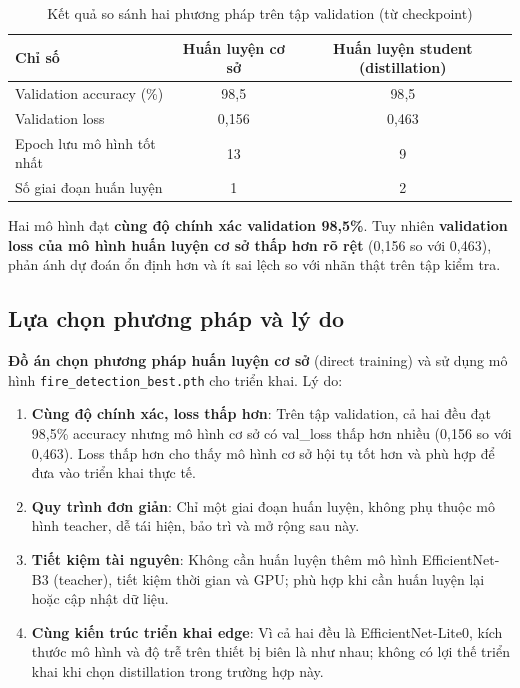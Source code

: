 \documentclass[12pt,a4paper]{report}
\begin{document}
\begin{table}[h]
  \centering
  \caption{Kết quả so sánh hai phương pháp trên tập validation (từ checkpoint)}
  \begin{tabular}{lcc}
    \toprule
    Chỉ số & Huấn luyện cơ sở & Huấn luyện student (distillation) \\
    \midrule
    Validation accuracy (\%) & 98{,}5 & 98{,}5 \\
    Validation loss & 0{,}156 & 0{,}463 \\
    Epoch lưu mô hình tốt nhất & 13 & 9 \\
    Số giai đoạn huấn luyện & 1 & 2 \\
    \bottomrule
  \end{tabular}
\end{table}

Hai mô hình đạt \textbf{cùng độ chính xác validation 98{,}5\%}. Tuy nhiên \textbf{validation loss của mô hình huấn luyện cơ sở thấp hơn rõ rệt} (0{,}156 so với 0{,}463), phản ánh dự đoán ổn định hơn và ít sai lệch so với nhãn thật trên tập kiểm tra.

\subsection{Lựa chọn phương pháp và lý do}

\textbf{Đồ án chọn phương pháp huấn luyện cơ sở} (direct training) và sử dụng mô hình \texttt{fire\_detection\_best.pth} cho triển khai. Lý do:

\begin{enumerate}
  \item \textbf{Cùng độ chính xác, loss thấp hơn}: Trên tập validation, cả hai đều đạt 98{,}5\% accuracy nhưng mô hình cơ sở có val\_loss thấp hơn nhiều (0{,}156 so với 0{,}463). Loss thấp hơn cho thấy mô hình cơ sở hội tụ tốt hơn và phù hợp để đưa vào triển khai thực tế.
  \item \textbf{Quy trình đơn giản}: Chỉ một giai đoạn huấn luyện, không phụ thuộc mô hình teacher, dễ tái hiện, bảo trì và mở rộng sau này.
  \item \textbf{Tiết kiệm tài nguyên}: Không cần huấn luyện thêm mô hình EfficientNet-B3 (teacher), tiết kiệm thời gian và GPU; phù hợp khi cần huấn luyện lại hoặc cập nhật dữ liệu.
  \item \textbf{Cùng kiến trúc triển khai edge}: Vì cả hai đều là EfficientNet-Lite0, kích thước mô hình và độ trễ trên thiết bị biên là như nhau; không có lợi thế triển khai khi chọn distillation trong trường hợp này.
\end{enumerate}
\end{document}
